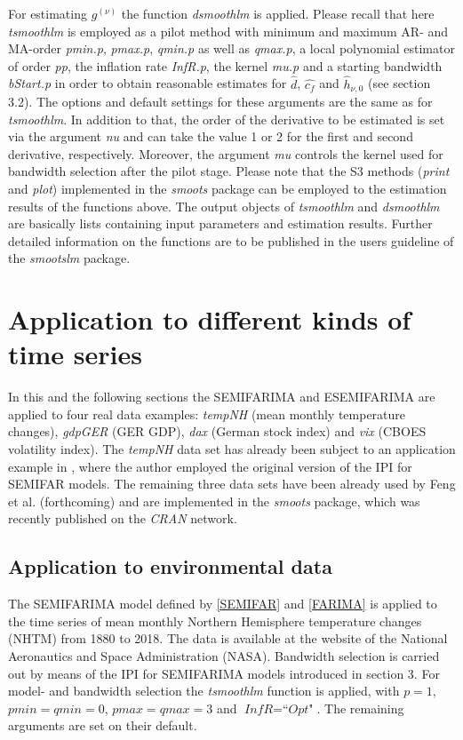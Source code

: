 \documentclass[12pt]{article}
\begin{document}
For estimating $g^{(\nu)}$ the function \textit{dsmoothlm} is applied. Please recall that here \textit{tsmoothlm} is employed as a pilot method with minimum and maximum AR- and MA-order \textit{pmin.p}, \textit{pmax.p}, \textit{qmin.p} as well as \textit{qmax.p}, a local polynomial estimator of order \textit{pp}, the inflation rate \textit{InfR.p}, the kernel \textit{mu.p} and a starting bandwidth \textit{bStart.p} in order to obtain reasonable estimates for $\hat{d}$, $\hat{c_f}$ and $\hat{h}_{\nu,0}$ (see section 3.2). The options and default settings for these arguments are the same as for \textit{tsmoothlm}. In addition to that, the order of the derivative to be estimated is set via the argument \textit{nu} and can take the value 1 or 2 for the first and second derivative, respectively. Moreover, the argument \textit{mu} controls the kernel used for bandwidth selection after the pilot stage. Please note that the S3 methods (\textit{print} and \textit{plot}) implemented in the \textit{smoots} package can be employed to the estimation results of the functions above. The output objects of \textit{tsmoothlm} and \textit{dsmoothlm} are basically lists containing input parameters and estimation results. Further detailed information on the functions are to be published in the users guideline of the \textit{smootslm} package.       


\section{Application to different kinds of time series}
In this and the following sections the SEMIFARIMA and ESEMIFARIMA are applied to four real data examples: \textit{tempNH} (mean monthly temperature changes), \textit{gdpGER} (GER GDP), \textit{dax} (German stock index) and \textit{vix} (CBOES volatility index). The \textit{tempNH} data set has already been subject to an application example in \citet{feng2007asymptotic}, where the author employed the original version of the IPI for SEMIFAR models. The remaining three data sets have been already used by Feng et al. (forthcoming) and are implemented in the \textit{smoots} package, which was recently published on the \textit{CRAN} network. 

\subsection{Application to environmental data}
The SEMIFARIMA model defined by \eqref{SEMIFAR} and \eqref{FARIMA} is applied to the time series of mean monthly Northern Hemisphere temperature changes (NHTM) from 1880 to 2018. The data is available at the website of the National Aeronautics and Space Administration (NASA). Bandwidth selection is carried out by means of the IPI for SEMIFARIMA models introduced in section 3. For model- and bandwidth selection the \textit{tsmoothlm} function is applied, with $\textit{p} = 1$, $\textit{pmin} = \textit{qmin} = 0$, $\textit{pmax} = \textit{qmax} = 3$ and $\textit{InfR} = \textit{``Opt"}$. The remaining arguments are set on their default. 
\end{document}
